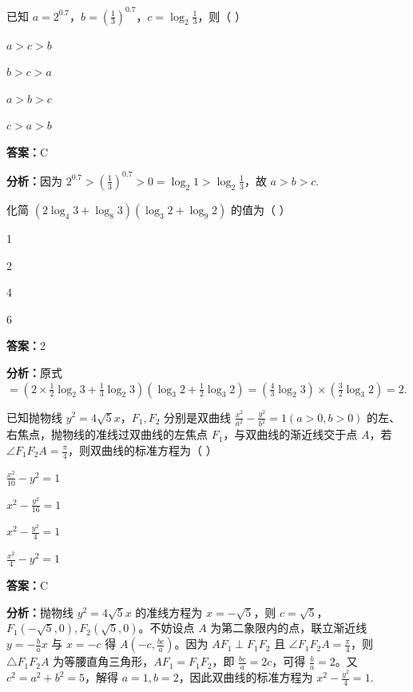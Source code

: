\begin{question}[points=5]
已知 $a=2^{0.7}$，$b=\left(\frac{1}{3}\right)^{0.7}$，$c=\log_2\frac{1}{3}$，则（   ）
\begin{choices}
  \item $a>c>b$
  \item $b>c>a$
  \item $a>b>c$
  \item $c>a>b$
\end{choices}
\begin{solution}
\textbf{答案：}C

\textbf{分析：}因为 $2^{0.7}>\left(\frac{1}{3}\right)^{0.7}>0=\log_2 1>\log_2\frac{1}{3}$，故 $a>b>c$.
\end{solution}
\end{question}

\begin{question}[points=5]
化简 $(2\log_4 3+\log_8 3)(\log_3 2+\log_9 2)$ 的值为（   ）
\begin{choices}
  \item 1
  \item 2
  \item 4
  \item 6
\end{choices}
\begin{solution}
\textbf{答案：}2

\textbf{分析：}原式 $=(2\times\frac{1}{2}\log_2 3+\frac{1}{3}\log_2 3)(\log_3 2+\frac{1}{2}\log_3 2)=(\frac{4}{3}\log_2 3)\times(\frac{3}{2}\log_3 2)=2$.
\end{solution}
\end{question}

\begin{question}[points=5]
已知抛物线 $y^2=4\sqrt{5}x$，$F_1,F_2$ 分别是双曲线 $\frac{x^2}{a^2}-\frac{y^2}{b^2}=1(a>0,b>0)$ 的左、右焦点，抛物线的准线过双曲线的左焦点 $F_1$，与双曲线的渐近线交于点 $A$，若 $\angle F_1F_2A=\frac{\pi}{4}$，则双曲线的标准方程为（   ）
\begin{choices}
  \item $\frac{x^2}{10}-y^2=1$
  \item $x^2-\frac{y^2}{16}=1$
  \item $x^2-\frac{y^2}{4}=1$
  \item $\frac{x^2}{4}-y^2=1$
\end{choices}
\begin{solution}
\textbf{答案：}C

\textbf{分析：}抛物线 $y^2=4\sqrt{5}x$ 的准线方程为 $x=-\sqrt{5}$，则 $c=\sqrt{5}$，$F_1(-\sqrt{5},0),F_2(\sqrt{5},0)$。不妨设点 $A$ 为第二象限内的点，联立渐近线 $y=-\frac{b}{a}x$ 与 $x=-c$ 得 $A(-c,\frac{bc}{a})$。因为 $AF_1\perp F_1F_2$ 且 $\angle F_1F_2A=\frac{\pi}{4}$，则 $\triangle F_1F_2A$ 为等腰直角三角形，$AF_1=F_1F_2$，即 $\frac{bc}{a}=2c$，可得 $\frac{b}{a}=2$。又 $c^2=a^2+b^2=5$，解得 $a=1,b=2$，因此双曲线的标准方程为 $x^2-\frac{y^2}{4}=1$.
\end{solution}
\end{question}

